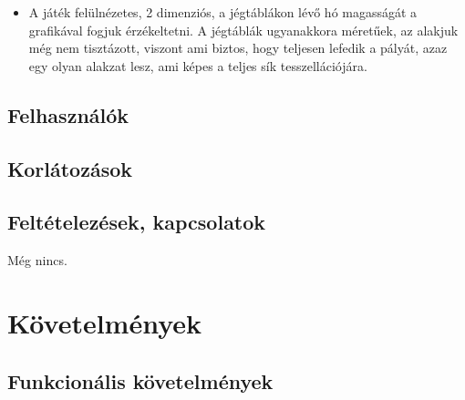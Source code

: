 \begin{itemize}
\item A játék felülnézetes, 2 dimenziós, a jégtáblákon lévő hó magasságát a grafikával fogjuk érzékeltetni. A jégtáblák ugyanakkora méretűek, az alakjuk még nem tisztázott, viszont ami biztos, hogy teljesen lefedik a pályát, azaz egy olyan alakzat lesz, ami képes a teljes sík tesszellációjára.
\end{itemize}
\subsection{Felhasználók}

\subsection{Korlátozások}

\subsection{Feltételezések, kapcsolatok}
Még nincs.

\section{Követelmények}
\subsection{Funkcionális követelmények}



